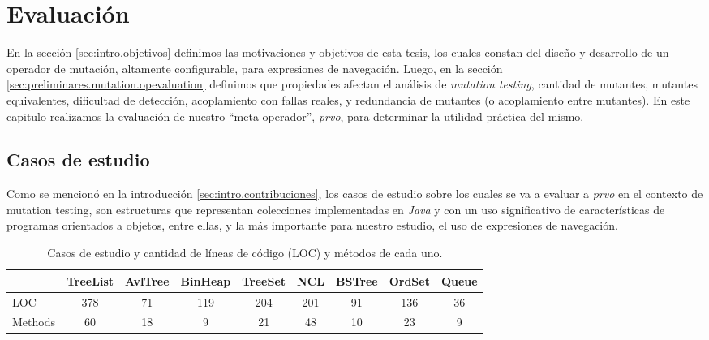 \chapter[Evaluaci\'on]{Evaluaci\'on}
\label{cap:evaluation}

En la secci\'on \ref{sec:intro.objetivos} definimos las motivaciones y objetivos de esta tesis, los cuales constan del dise\~no y desarrollo de un operador de mutaci\'on, altamente configurable, para expresiones de navegaci\'on. Luego, en la secci\'on \ref{sec:preliminares.mutation.opevaluation} definimos que propiedades afectan el an\'alisis de \emph{mutation testing}, cantidad de mutantes, mutantes equivalentes, dificultad de detecci\'on, acoplamiento con fallas reales, y redundancia de mutantes (o acoplamiento entre mutantes). En este capitulo realizamos la evaluaci\'on de nuestro ``meta-operador'', \emph{prvo}, para determinar la utilidad pr\'actica del mismo.

\section{Casos de estudio}
\label{sec:evaluation.benchmark}

Como se mencion\'o en la introducci\'on \ref{sec:intro.contribuciones}, los casos de estudio sobre los cuales se va a evaluar a \emph{prvo} en el contexto de mutation testing, son estructuras que representan colecciones implementadas en \emph{Java} y con un uso significativo de caracter\'isticas de programas orientados a objetos, entre ellas, y la m\'as importante para nuestro estudio, el uso de expresiones de navegaci\'on. 

\begin{table}[]
	\def\arraystretch{0.95}
	\setlength\tabcolsep{1.7mm}
	\small
	\begin{tabular}{l|cccccccc|}
		\cline{2-9}
		& TreeList & AvlTree & BinHeap & TreeSet & NCL & BSTree & OrdSet & \multicolumn{1}{l|}{Queue} \\ \hline
		\multicolumn{1}{|l|}{LOC} & \multicolumn{1}{c|}{378} & \multicolumn{1}{c|}{71} & \multicolumn{1}{c|}{119} & \multicolumn{1}{c|}{204} & \multicolumn{1}{c|}{201} & \multicolumn{1}{c|}{91} & \multicolumn{1}{c|}{136} & 36 \\ \cline{1-1}
		\multicolumn{1}{|l|}{Methods} & \multicolumn{1}{c|}{60} & \multicolumn{1}{c|}{18} & \multicolumn{1}{c|}{9} & \multicolumn{1}{c|}{21} & \multicolumn{1}{c|}{48} & \multicolumn{1}{c|}{10} & \multicolumn{1}{c|}{23} & 9 \\ \hline
	\end{tabular}
	\caption{Casos de estudio y cantidad de l\'ineas de c\'odigo (LOC) y m\'etodos de cada uno.}
	\label{tables.studyCases}
\end{table}

